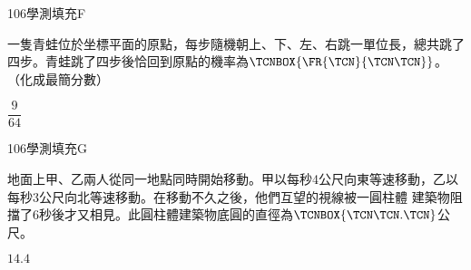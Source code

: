     \begin{QUESTION}
        \begin{ExamInfo}{106}{學測}{填充}{F}
        \end{ExamInfo}
        \begin{ExamAnsRateInfo}{19}{45}{11}{1}
        \end{ExamAnsRateInfo}
        \begin{QBODY}
            一隻青蛙位於坐標平面的原點，每步隨機朝上、下、左、右跳一單位長，總共跳了四步。青蛙跳了四步後恰回到原點的機率為$\TCNBOX{\FR{\TCN}{\TCN\TCN}}$。（化成最簡分數）
        \end{QBODY}
        \begin{QFROMS}
        \end{QFROMS}
        \begin{QTAGS}\end{QTAGS}
        \begin{QANS}
            $\dfrac{9}{64}$
        \end{QANS}
        \begin{QSOLLIST}
        \end{QSOLLIST}
        \begin{QEMPTYSPACE}
        \end{QEMPTYSPACE}
    \end{QUESTION}
    \begin{QUESTION}
        \begin{ExamInfo}{106}{學測}{填充}{G}
        \end{ExamInfo}
        \begin{ExamAnsRateInfo}{22}{56}{9}{1}
        \end{ExamAnsRateInfo}
        \begin{QBODY}
            地面上甲、乙兩人從同一地點同時開始移動。甲以每秒4公尺向東等速移動，乙以每秒3公尺向北等速移動。在移動不久之後，他們互望的視線被一圓柱體 建築物阻擋了6秒後才又相見。此圓柱體建築物底圓的直徑為$\TCNBOX{\TCN\TCN.\TCN}$公尺。
        \end{QBODY}
        \begin{QFROMS}
        \end{QFROMS}
        \begin{QTAGS}\end{QTAGS}
        \begin{QANS}
            $14.4$
        \end{QANS}
        \begin{QSOLLIST}
        \end{QSOLLIST}
        \begin{QEMPTYSPACE}
        \end{QEMPTYSPACE}
    \end{QUESTION}

